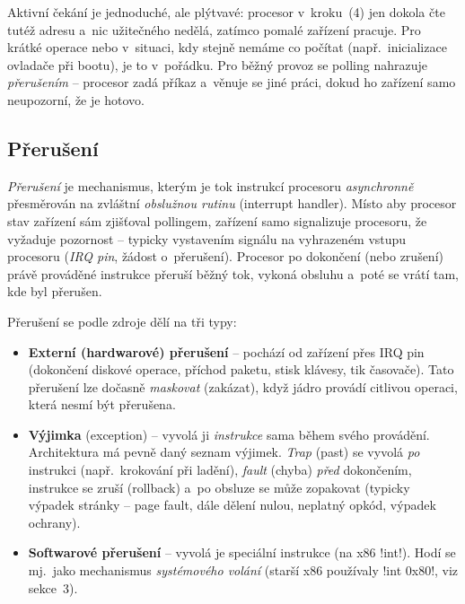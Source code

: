 \begin{intuice}
Aktivní čekání je jednoduché, ale plýtvavé: procesor v~kroku~(4) jen dokola čte tutéž adresu a~nic užitečného nedělá, zatímco pomalé zařízení pracuje. Pro krátké operace nebo v~situaci, kdy stejně nemáme co počítat (např.\ inicializace ovladače při bootu), je to v~pořádku. Pro běžný provoz se polling nahrazuje \emph{přerušením} -- procesor zadá příkaz a~věnuje se jiné práci, dokud ho zařízení samo neupozorní, že je hotovo.
\end{intuice}

\subsection{Přerušení}

\begin{definice}
\emph{Přerušení} je mechanismus, kterým je tok instrukcí procesoru \emph{asynchronně} přesměrován na zvláštní \emph{obslužnou rutinu} (interrupt handler). Místo aby procesor stav zařízení sám zjišťoval pollingem, zařízení samo signalizuje procesoru, že vyžaduje pozornost -- typicky vystavením signálu na vyhrazeném vstupu procesoru (\emph{IRQ pin}, žádost o~přerušení). Procesor po dokončení (nebo zrušení) právě prováděné instrukce přeruší běžný tok, vykoná obsluhu a~poté se vrátí tam, kde byl přerušen.
\end{definice}

Přerušení se podle zdroje dělí na tři typy:

\begin{itemize}
\item \textbf{Externí (hardwarové) přerušení} -- pochází od zařízení přes IRQ pin (dokončení diskové operace, příchod paketu, stisk klávesy, tik časovače). Tato přerušení lze dočasně \emph{maskovat} (zakázat), když jádro provádí citlivou operaci, která nesmí být přerušena.
\item \textbf{Výjimka} (exception) -- vyvolá ji \emph{instrukce} sama během svého provádění. Architektura má pevně daný seznam výjimek. \emph{Trap} (past) se vyvolá \emph{po} instrukci (např.\ krokování při ladění), \emph{fault} (chyba) \emph{před} dokončením, instrukce se zruší (rollback) a~po obsluze se může zopakovat (typicky výpadek stránky -- page fault, dále dělení nulou, neplatný opkód, výpadek ochrany).
\item \textbf{Softwarové přerušení} -- vyvolá je speciální instrukce (na x86 \cd!int!). Hodí se mj.\ jako mechanismus \emph{systémového volání} (starší x86 používaly \cd!int 0x80!, viz sekce~3).
\end{itemize}

